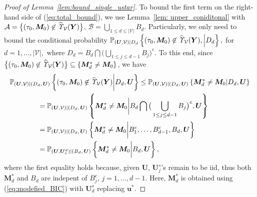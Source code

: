 \documentclass[12pt]{article}
\theoremstyle{shortspace}
\def\*#1{\bm{#1}}
\def\P{\mathbb P}
\begin{document}
\begin{proof}[Proof of Lemma~\ref{lem:bound_single_ustar}]
To bound the first term on the right-hand side of (\ref{eq:total_bound}), we use Lemma~\ref{lem: upper_coniditonal} with 
${\mathcal A} =\big\{ (\tau_0, \*M_0) \not\in \widehat{\it \Upsilon}_{{\mathcal V}}(\*Y)\big\}$, ${\mathcal B} = \bigcup_{1 \leq d \leq |\mathcal V|}B_d$. Particularly, we only need to bound the conditional probability 
$\P_{(\*U,\mathcal V) | D_d}\left\{(\tau_0, \*M_0) \not\in \widehat{\it \Upsilon}_{{\mathcal V}}(\*Y), \middle | D_d 
\right\},$ 
for $d =1, \dots, |\mathcal V|,$ where $D_d = B_d \bigcap\big(\bigcup_{1\leq j \leq d-1} B_j\big)^c$.
To this end, since 
$\big\{(\tau_0, \*M_0) \not\in \widehat{\it \Upsilon}_{{\mathcal V}}(\*Y)\big\} \subseteq \{\*M^*_{d}  \neq \*M_0  \}
$, we have 
\begin{align*}
    & \P_{(\*U,\mathcal V) | (D_d, \, \*U)}\left\{(\tau_0, \*M_0) \not\in \widehat{\it \Upsilon}_{{\mathcal V}}(\*Y) \bigg| D_d,  \*U\right\} \leq \P_{(\*U,\mathcal V) | (D_d, \, \*U)}\left\{ \*M^*_{d}  \neq \*M_0  |  D_d,  \*U\right\} \\
    & \qquad\qquad = 
    \P_{(\*U,\mathcal V) | (D_d, \, \*U)}\left\{ \*M^*_{d}  \neq \*M_0  \bigg| B_d \bigcap\big(\bigcup_{1\leq j \leq d-1} B_j\big)^c,  \*U\right\}
    \\
    & \qquad\qquad = 
    \P_{(\*U,\mathcal V) | (D_d, \, \*U)}\left\{ \*M^*_{d}  \neq \*M_0  \bigg| B_1^c, \ldots, B_{d-1}^c, B_d,  \*U\right\}  \\ & \qquad\qquad = 
    \P_{(\*U,\*U_s^d) | (B_d, \, \*U)}\left\{ \*M^*_{d}  \neq \*M_0  \bigg| B_d,  \*U\right\},
\end{align*}
 where the first equality holds because, given $\*U$, $\*U^s_j$'s remain to be iid, thus both $\*M^*_{d}$ and $B_d$ are indepent of $B_j^c$, $j =1, \ldots, d-1$.
Here, 
$\*M^*_{d}$ is obtained using (\ref{eq:modefied_BIC}) with 
 $\*U_d^s$ replacing $\*u^*$.




\end{proof}
\end{document}
